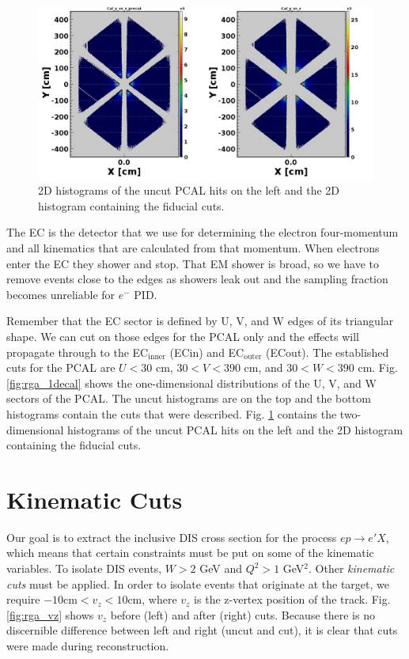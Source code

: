 \begin{figure}[h!]
	\centering
	\includegraphics[width=0.9\linewidth]{figures/rga/2d_ecal.png}
	\caption{2D histograms of the uncut PCAL hits on the left and the 2D histogram containing the fiducial cuts.}
	\label{fig:rga_2decal}
\end{figure}

The EC is the detector that we use for determining the electron four-momentum and all kinematics that are calculated from that momentum. When electrons enter the EC they shower and stop. That EM shower is broad, so we have to remove events close to the edges as showers leak out and the sampling fraction becomes unreliable for $e^-$ PID.

Remember that the EC sector is defined by U, V, and W edges of its triangular shape. We can cut on those edges for the PCAL only and the effects will propagate through to the EC$_{\mathrm{inner}}$ (ECin) and EC$_{\mathrm{outer}}$ (ECout). The established cuts for the PCAL are $U<30$ cm, $30<V<390$ cm, and $30<W<390$ cm. Fig. \ref{fig:rga_1decal} shows the one-dimensional distributions of the U, V, and W sectors of the PCAL. The uncut histograms are on the top and the bottom histograms contain the cuts that were described. Fig. \ref{fig:rga_2decal} contains the two-dimensional histograms of the uncut PCAL hits on the left and the 2D histogram containing the fiducial cuts.

\section{Kinematic Cuts}
Our goal is to extract the inclusive DIS cross section for the process $ep \longrightarrow e'X$, which means that certain constraints must be put on some of the kinematic variables. To isolate DIS events, $W>2$ GeV and $Q^2>1$ GeV$^2$. Other \textit{kinematic cuts} must be applied. In order to isolate events that originate at the target, we require $-10 \mathrm{cm} < v_z < 10 \mathrm{cm}$, where $v_z$ is the z-vertex position of the track. Fig. \ref{fig:rga_vz} shows $v_z$ before (left) and after (right) cuts. Because there is no discernible difference between left and right (uncut and cut), it is clear that cuts were made during reconstruction.

